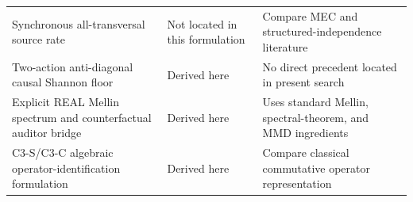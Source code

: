 \documentclass[11pt,a4paper]{article}
\newcommand{\1}{\mathbf 1}
\begin{document}
\begin{center}
\begin{tabular}{
>{\raggedright\arraybackslash}p{}
>{\raggedright\arraybackslash}p{}
>{\raggedright\arraybackslash}p{}
}
Synchronous all-transversal source rate
&
Not located in this formulation
&
Compare MEC and structured-independence literature
\\

Two-action anti-diagonal causal Shannon floor
&
Derived here
&
No direct precedent located in present search
\\

Explicit REAL Mellin spectrum and counterfactual auditor bridge
&
Derived here
&
Uses standard Mellin, spectral-theorem, and MMD ingredients
\\

C3-S/C3-C algebraic operator-identification formulation
&
Derived here
&
Compare classical commutative operator representation
\\

\bottomrule
\end{tabular}
\end{center}
\end{document}
